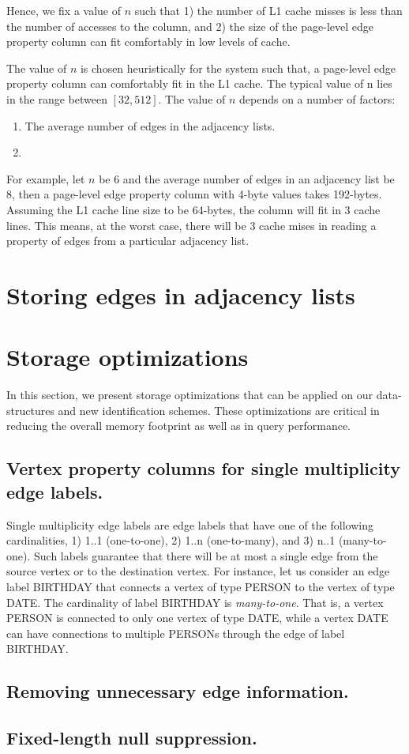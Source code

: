 Hence, we fix a value of $n$ such that 1) the number of L1 cache misses is less than the number of accesses to the column, and 2) the size of the page-level edge property column can fit comfortably in low levels of cache.

The value of $n$ is chosen heuristically for the system such that, a page-level edge property column can comfortably fit in the L1 cache. The typical value of n lies in the range between $[32, 512]$. The value of $n$ depends on a number of factors: 
\begin{enumerate}
	\item The average number of edges in the adjacency lists.
	\item  
\end{enumerate} 


For example, let $n$ be 6 and the average number of edges in an adjacency list be 8, then a page-level edge property column with 4-byte values takes 192-bytes. Assuming the L1 cache line size to be 64-bytes, the column will fit in 3 cache lines. This means, at the worst case, there will be 3 cache mises in reading a property of edges from a particular adjacency list.




\section{Storing edges in adjacency lists}
\label{sec:adjacency-lists}

\section{Storage optimizations}
\label{sec:storage-optimizations}

In this section, we present storage optimizations that can be applied on our data-structures and new identification schemes. These optimizations are critical in reducing the overall memory footprint as well as in query performance. 

\subsection{Vertex property columns for single multiplicity edge labels.}

Single multiplicity edge labels are edge labels that have one of the following cardinalities, 1) 1..1 (one-to-one), 2) 1..n (one-to-many), and 3) n..1 (many-to-one). Such labels guarantee that there will be at most a single edge from the source vertex or to the destination vertex. For instance, let us consider an edge label BIRTHDAY that connects a vertex of type PERSON to the vertex of type DATE. The cardinality of label BIRTHDAY is \emph{many-to-one}. That is, a vertex PERSON is connected to only one vertex of type DATE, while a vertex DATE can have connections to multiple PERSONs through the edge of label BIRTHDAY.



\subsection{Removing unnecessary edge information.}

\subsection{Fixed-length null suppression.}
